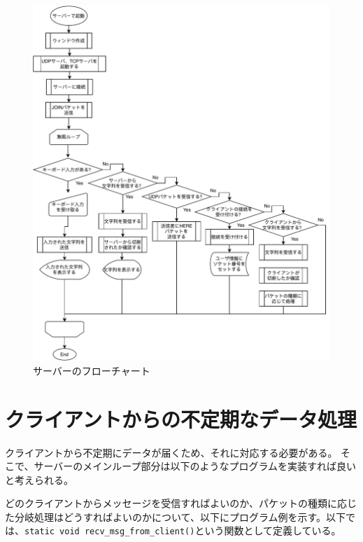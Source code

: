 \documentclass[uplatex,dvipdfmx,11pt,a4paper]{jsarticle} %
\begin{document}
\begin{figure}[H]
\centering
\includegraphics[width=\hsize]{figures/flow/4.pdf}
\caption{サーバーのフローチャート}
\label{fg:server}
\end{figure}

\section{クライアントからの不定期なデータ処理}
クライアントから不定期にデータが届くため、それに対応する必要がある。
そこで、サーバーのメインループ部分は以下のようなプログラムを実装すれば良いと考えられる。



どのクライアントからメッセージを受信すればよいのか、パケットの種類に応じた分岐処理はどうすればよいのかについて、以下にプログラム例を示す。以下では、{\tt static void recv\_msg\_from\_client()}という関数として定義している。



% 
\end{document}
